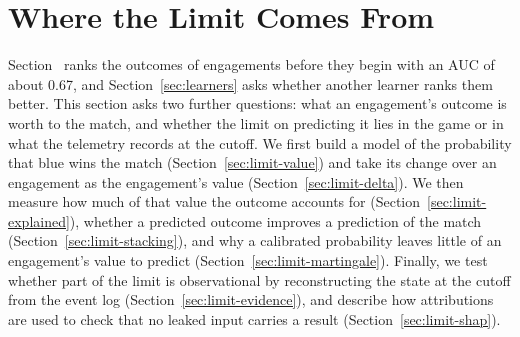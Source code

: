 %

\section{Where the Limit Comes From}\label{sec:limit}

Section~ ranks the outcomes of engagements before they begin with an AUC of
about 0.67, and Section~\ref{sec:learners} asks whether another learner ranks them better. This section
asks two further questions: what an engagement's outcome is worth to the match, and whether the limit on
predicting it lies in the game or in what the telemetry records at the cutoff. We first build a model of
the probability that blue wins the match (Section~\ref{sec:limit-value}) and take its change over an
engagement as the engagement's value (Section~\ref{sec:limit-delta}). We then measure how much of that
value the outcome accounts for (Section~\ref{sec:limit-explained}), whether a predicted outcome improves
a prediction of the match (Section~\ref{sec:limit-stacking}), and why a calibrated probability leaves
little of an engagement's value to predict (Section~\ref{sec:limit-martingale}). Finally, we test whether
part of the limit is observational by reconstructing the state at the cutoff from the event log
(Section~\ref{sec:limit-evidence}), and describe how attributions are used to check that no leaked input
carries a result (Section~\ref{sec:limit-shap}).

